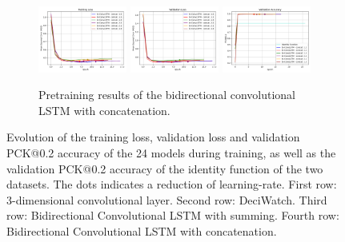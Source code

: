 \documentclass[./main.tex]{subfiles}
\begin{document}
\begin{figure}[htbp]
    \begin{subfigure}[b]{\textwidth}
        \centering
        \includegraphics[width=0.32\textwidth]{./entities/pretrain_res/unipose2/train_losses.png}
        \includegraphics[width=0.32\textwidth]{./entities/pretrain_res/unipose2/val_losses.png}
        \includegraphics[width=0.32\textwidth]{./entities/pretrain_res/unipose2/val_accs.png}
        \caption{Pretraining results of the bidirectional convolutional LSTM with concatenation.}
    \end{subfigure}
    \hfill
    
    \caption{Evolution of the training loss, validation loss and validation PCK@0.2 accuracy of the 24 models during training, as well as the validation PCK@0.2 accuracy of the identity function of the two datasets. The dots indicates a reduction of learning-rate. First row: 3-dimensional convolutional layer. Second row: DeciWatch. Third row: Bidirectional Convolutional LSTM with summing. Fourth row: Bidirectional Convolutional LSTM with concatenation.}
    \label{fig:pretrainin_res}
\end{figure}
\end{document}
